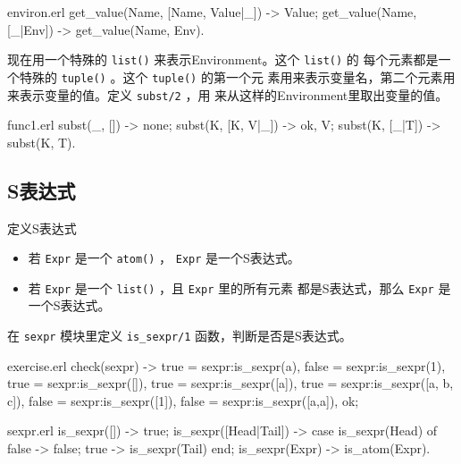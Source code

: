 \documentclass[preview,multi,crop=false,border=1in,class=memoir]{standalone}
\begin{document}
\begin{preview-page}
\begin{Answer}
\begin{SourceCode}[6]{environ.erl}
get_value(Name, [{Name, Value}|_]) ->
    Value;
get_value(Name, [_|Env]) ->
    get_value(Name, Env).
\end{SourceCode}
\end{Answer}

\nonzeroparskip

现在用一个特殊的 \verb|list()| 来表示Environment。这个 \verb|list()| 的
每个元素都是一个特殊的 \verb|tuple()| 。这个 \verb|tuple()| 的第一个元
素用来表示变量名，第二个元素用来表示变量的值。定义 \verb|subst/2| ，用
来从这样的Environment里取出变量的值。

\begin{SourceCode}[7][12]{func1.erl}
subst(_, []) ->
    none;
subst(K, [{K, V}|_]) ->
    {ok, V};
subst(K, [_|T]) ->
    subst(K, T).
\end{SourceCode}


\subsection{S表达式}

定义S表达式 \cite{McCarthy:1960:symbolic}

\begin{itemize}
\item 若 \verb|Expr| 是一个 \verb|atom()| ， \verb|Expr| 是一个S表达式。
\item 若 \verb|Expr| 是一个 \verb|list()| ，且 \verb|Expr| 里的所有元素
都是S表达式，那么 \verb|Expr| 是一个S表达式。
\end{itemize}

\begin{Exercise}[title={sexpr},difficulty=1]
在 \verb|sexpr| 模块里定义 \verb|is_sexpr/1| 函数，判断是否是S表达式。


\begin{SourceCode}[12][20]{exercise.erl}
check(sexpr) ->
    true = sexpr:is_sexpr(a),
    false = sexpr:is_sexpr(1),
    true = sexpr:is_sexpr([]),
    true = sexpr:is_sexpr([a]),
    true = sexpr:is_sexpr([a, b, c]),
    false = sexpr:is_sexpr([1]),
    false = sexpr:is_sexpr([{a,a}]),
    ok;
\end{SourceCode}
\end{Exercise}

\begin{Answer}
\begin{SourceCode}[6][16]{sexpr.erl}
is_sexpr([]) ->
    true;
is_sexpr([Head|Tail]) ->
    case is_sexpr(Head) of
        false ->
            false;
        true ->
            is_sexpr(Tail)
    end;
is_sexpr(Expr) ->
    is_atom(Expr).
\end{SourceCode}
\end{Answer}


\end{preview-page}
\end{document}
